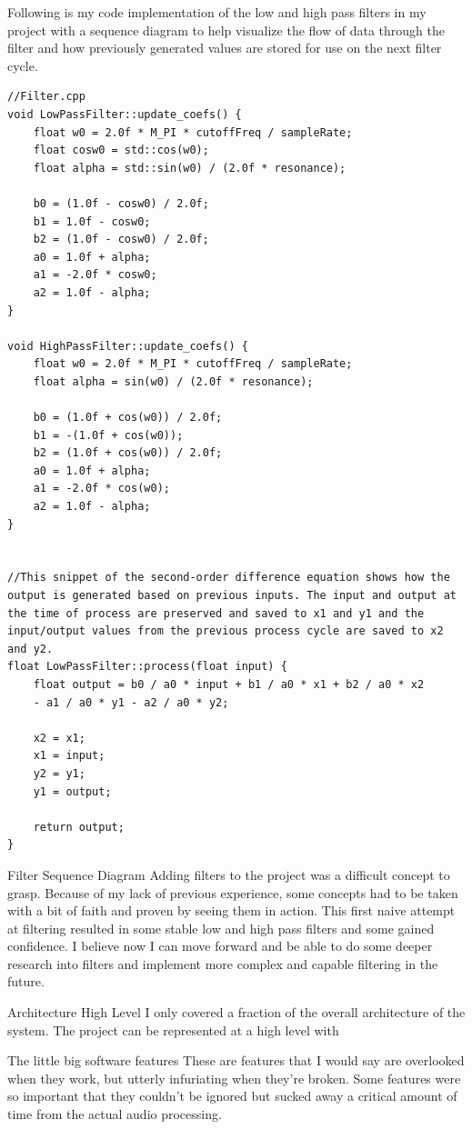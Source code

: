 \documentclass[acmlarge,screen]{acmart}
\begin{document}
Following is my code implementation of the low and high pass filters in my project with a sequence diagram to help visualize the flow of data through the filter and how previously generated values are stored for use on the next filter cycle.

\begin{lstlisting}
//Filter.cpp
void LowPassFilter::update_coefs() {
	float w0 = 2.0f * M_PI * cutoffFreq / sampleRate;
	float cosw0 = std::cos(w0);
	float alpha = std::sin(w0) / (2.0f * resonance);
	
	b0 = (1.0f - cosw0) / 2.0f;
	b1 = 1.0f - cosw0;
	b2 = (1.0f - cosw0) / 2.0f;
	a0 = 1.0f + alpha;
	a1 = -2.0f * cosw0;
	a2 = 1.0f - alpha;
}

void HighPassFilter::update_coefs() {
	float w0 = 2.0f * M_PI * cutoffFreq / sampleRate;
	float alpha = sin(w0) / (2.0f * resonance);
	
	b0 = (1.0f + cos(w0)) / 2.0f;
	b1 = -(1.0f + cos(w0));
	b2 = (1.0f + cos(w0)) / 2.0f;
	a0 = 1.0f + alpha;
	a1 = -2.0f * cos(w0);
	a2 = 1.0f - alpha;
}


//This snippet of the second-order difference equation shows how the output is generated based on previous inputs. The input and output at the time of process are preserved and saved to x1 and y1 and the input/output values from the previous process cycle are saved to x2 and y2.
float LowPassFilter::process(float input) {
	float output = b0 / a0 * input + b1 / a0 * x1 + b2 / a0 * x2
	- a1 / a0 * y1 - a2 / a0 * y2;
	
	x2 = x1;
	x1 = input;
	y2 = y1;
	y1 = output;
	
	return output;
}
\end{lstlisting}


Filter Sequence Diagram
Adding filters to the project was a difficult concept to grasp. Because of my lack of previous experience, some concepts had to be taken with a bit of faith and proven by seeing them in action. This first naive attempt at filtering resulted in some stable low and high pass filters and some gained confidence. I believe now I can move forward and be able to do some deeper research into filters and implement more complex and capable filtering in the future.

Architecture High Level
I only covered a fraction of the overall architecture of the system. The project can be represented at a high level with

The little big software features
These are features that I would say are overlooked when they work, but utterly infuriating when they're broken. Some features were so important that they couldn't be ignored but sucked away a critical amount of time from the actual audio processing.
\end{document}
